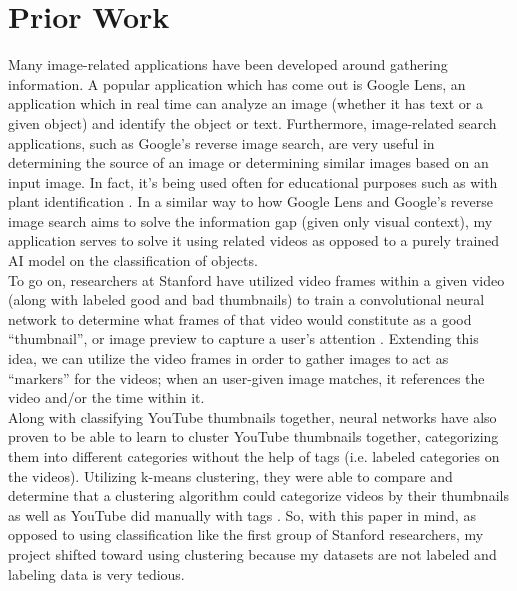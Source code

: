 \documentclass[10pt,twocolumn]{article}
\begin{document}
\section{Prior Work}

Many image-related applications have been developed around gathering information. A popular application which has come out is Google Lens, an application which in real time can analyze an image (whether it has text or a given object) and identify the object or text. Furthermore, image-related search applications, such as Google’s reverse image search, are very useful in determining the source of an image or determining similar images based on an input image. In fact, it’s being used often for educational purposes such as with plant identification \cite{Moore2018}. In a similar way to how Google Lens and Google’s reverse image search aims to solve the information gap (given only visual context), my application serves to solve it using related videos as opposed to a purely trained AI model on the classification of objects. \\ 
\indent To go on, researchers at Stanford have utilized video frames within a given video (along with labeled good and bad thumbnails) to train a convolutional neural network to determine what frames of that video would constitute as a good “thumbnail”, or image preview to capture a user’s attention \cite{Stanford2017}. Extending this idea, we can utilize the video frames in order to gather images to act as “markers” for the videos; when an user-given image matches, it references the video and/or the time within it.\\
\indent Along with classifying YouTube thumbnails together, neural networks have also proven to be able to learn to cluster YouTube thumbnails together, categorizing them into different categories without the help of tags (i.e. labeled categories on the videos). Utilizing k-means clustering, they were able to compare and determine that a clustering algorithm could categorize videos by their thumbnails as well as YouTube did manually with tags \cite{Stanford2021}. So, with this paper in mind, as opposed to using classification like the first group of Stanford researchers, my project shifted toward using clustering because my datasets are not labeled and labeling data is very tedious. \\
\end{document}
